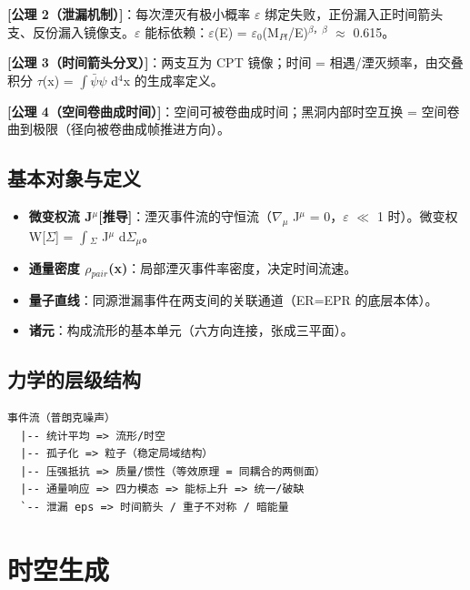 \documentclass[UTF8,fontset=windows]{csoarticle}
\newcommand{\mtag}[1]{\textbf{[#1]}}
\newcommand{\up}[1]{\ensuremath{^{#1}}}
\newcommand{\down}[1]{\ensuremath{_{#1}}}
\begin{document}
\textbf{\mtag{公理 2（泄漏机制）}}：每次湮灭有极小概率 \ensuremath{\varepsilon} 绑定失败，正份漏入正时间箭头支、反份漏入镜像支。\ensuremath{\varepsilon} 能标依赖：\ensuremath{\varepsilon}(E) = \ensuremath{\varepsilon}\down{0}(M\down{Pl}/E)\up{\beta{}，\beta{}} \ensuremath{\approx} 0.615。

\textbf{\mtag{公理 3（时间箭头分叉）}}：两支互为 CPT 镜像；时间 = 相遇/湮灭频率，由交叠积分 \ensuremath{\tau}(x) = \ensuremath{\int}\ensuremath{\bar{\psi}}\ensuremath{\psi} d\up{4}x 的生成率定义。

\textbf{\mtag{公理 4（空间卷曲成时间）}}：空间可被卷曲成时间；黑洞内部时空互换 = 空间卷曲到极限（径向被卷曲成帧推进方向）。

\subsection{基本对象与定义}

\begin{itemize}
\item \textbf{微变权流 J\up{\mu{}}}\mtag{推导}：湮灭事件流的守恒流（\ensuremath{\nabla}\down{\mu{}} J\up{\mu{}} = 0，\ensuremath{\varepsilon} \ensuremath{\ll} 1 时）。微变权 W[\ensuremath{\Sigma}] = \ensuremath{\int}\down{\Sigma{}} J\up{\mu{}} d\ensuremath{\Sigma}\down{\mu{}}。
\item \textbf{通量密度 \ensuremath{\rho}\down{pair}(x)}：局部湮灭事件率密度，决定时间流速。
\item \textbf{量子直线}：同源泄漏事件在两支间的关联通道（ER=EPR 的底层本体）。
\item \textbf{诸元}：构成流形的基本单元（六方向连接，张成三平面）。
\end{itemize}

\subsection{力学的层级结构}

\begin{verbatim}
事件流（普朗克噪声）
  |-- 统计平均 => 流形/时空
  |-- 孤子化 => 粒子（稳定局域结构）
  |-- 压强抵抗 => 质量/惯性（等效原理 = 同耦合的两侧面）
  |-- 通量响应 => 四力模态 => 能标上升 => 统一/破缺
  `-- 泄漏 eps => 时间箭头 / 重子不对称 / 暗能量
\end{verbatim}



\section{时空生成}
\end{document}
